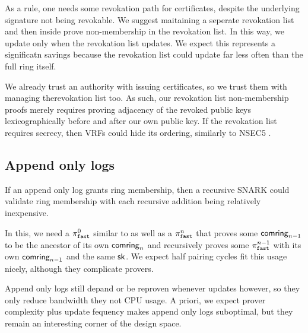 
As a rule, one needs some revokation path for certificates,
despite the underlying signature not being revokable. 
%
We suggest maitaining a seperate revokation list and then inside
\pifast prove non-membership in the revokation list.
In this way, we update \pifast only when the revokation list updates.
We expect this represents a significatn savings because the revokation
list could update far less often than the full ring \ctx itself.

We already trust an authority with issuing certificates, so we trust
them with managing therevokation list too.  As such, our revokation list
non-membership proofs merely requires proving adjacency of the revoked
public keys lexicographically before and after our own public key.
If the revokation list requires secrecy, then VRFs could hide its ordering,
similarly to NSEC5 \cite{nsec5}.


\subsection{Append only logs}

If an append only log grants ring membership, then a recursive SNARK
could validate ring membership with each recursive addition being
relatively inexpensive.

In this, we need a $\pi_{\mathtt{fast}}^0$ similar to \pifast as well as a
$\pi_{\mathtt{fast}}^n$ that proves some $\mathsf{comring}_{n-1}$ to be the ancestor of
its own $\mathsf{comring}_n$ and recursively proves some $\pi_{\mathtt{fast}}^{n-1}$ with
its own $\mathsf{comring}_{n-1}$ and the same $\mathsf{sk}$.
We expect half pairing cycles fit this usage nicely, although they complicate provers.

Append only logs still depand \pifast or \pisafe be reproven whenever
\ctx updates however, so they only reduce bandwidth they not CPU usage.
A priori, we expect prover complexity plus update fequency makes
append only logs suboptimal, but
 they remain an interesting corner of the design space.
